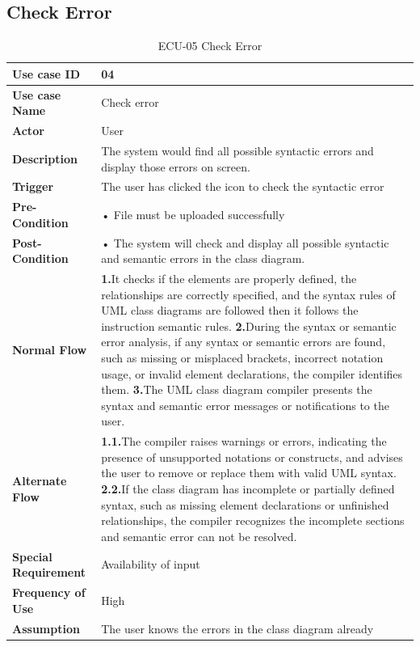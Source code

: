 \documentclass[12pt,a4paper]{article}
\begin{document}
\clearpage
\subsection{Check Error}
\begin{table}[h!]
\caption{ECU-05 Check Error}
    \centering
    \begin{tabular}{|l|p{10cm}|}
    \hline
       \textbf{Use case ID}&04 \\ %
       \hline
       \textbf{Use case Name}&Check error \\ %
       \hline
       \textbf{Actor}&User \\ %
       \hline
       \textbf{Description}&The system would find all possible syntactic errors and display those errors on screen.\\ %
       \hline
       \textbf{Trigger}&The user has clicked the icon to check the syntactic error \\ %
        \hline
       \textbf{Pre-Condition}&
•  File must be uploaded successfully
\\ %
        \hline
       \textbf{Post-Condition}&• The system will check and display all possible syntactic and semantic errors in the class diagram.
 \\ %
        \hline
       \textbf{Normal Flow}&\textbf{1.}It checks if the elements are properly defined, the relationships are correctly specified, and the syntax rules of UML class diagrams are followed then it follows the instruction semantic rules.
\newline\textbf{2.}During the syntax or semantic error analysis, if any syntax or semantic errors are found, such as missing or misplaced brackets, incorrect notation usage, or invalid element declarations, the compiler identifies them.
\newline\textbf{3.}The UML class diagram compiler presents the syntax and semantic error messages or notifications to the user. \\ %
\hline
\textbf{Alternate Flow}&\textbf{1.1.}The compiler raises warnings or errors, indicating the presence of unsupported notations or constructs, and advises the user to remove or replace them with valid UML syntax.
\newline\textbf{2.2.}If the class diagram has incomplete or partially defined syntax, such as missing element declarations or unfinished relationships, the compiler recognizes the incomplete sections and semantic error can not be resolved.\\ %
        \hline
       \textbf{Special Requirement}&Availability of input \\ %
        \hline
       \textbf{Frequency of Use}&High \\ %
        \hline
       \textbf{Assumption}&The user knows the errors in the class diagram already\\ %
       \hline
    \end{tabular} 
    \end{table}
\end{document}
